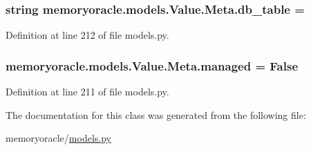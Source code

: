 \subsubsection[{db\+\_\+table}]{\setlength{\rightskip}{0pt plus 5cm}string memoryoracle.\+models.\+Value.\+Meta.\+db\+\_\+table = \textquotesingle{}\hspace{0.3cm}{\ttfamily [static]}}\label{classmemoryoracle_1_1models_1_1Value_1_1Meta_a6f22428ba16f59670b72f655f8e18c3c}


Definition at line 212 of file models.\+py.

\hypertarget{classmemoryoracle_1_1models_1_1Value_1_1Meta_a49f47f6a393f109c8a1e0d3f648b3858}{}
\subsubsection[{managed}]{\setlength{\rightskip}{0pt plus 5cm}memoryoracle.\+models.\+Value.\+Meta.\+managed = False\hspace{0.3cm}{\ttfamily [static]}}\label{classmemoryoracle_1_1models_1_1Value_1_1Meta_a49f47f6a393f109c8a1e0d3f648b3858}


Definition at line 211 of file models.\+py.



The documentation for this class was generated from the following file\+:\begin{DoxyCompactItemize}
\item 
memoryoracle/\hyperlink{models_8py}{models.\+py}\end{DoxyCompactItemize}
